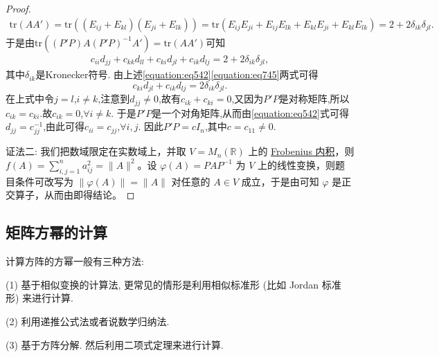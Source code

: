 \documentclass[../../main.tex]{subfiles}
\begin{document}
\begin{proof}
\begin{align*}
\mathrm{tr}\left( AA' \right) =\mathrm{tr}\left( \left( E_{ij}+E_{kl} \right) \left( E_{ji}+E_{lk} \right) \right) =\mathrm{tr}\left( E_{ij}E_{ji}+E_{ij}E_{lk}+E_{kl}E_{ji}+E_{kl}E_{lk} \right)=2 + 2\delta_{ik}\delta_{jl}.    
\end{align*}
于是由$\text{tr}((P'P)A(P'P)^{-1}A')=\text{tr}(AA')$可知
\begin{align}\label{equation:eq745}
c_{ii}d_{jj}+c_{kk}d_{ll}+c_{ki}d_{jl}+c_{ik}d_{lj}=2 + 2\delta_{ik}\delta_{jl},  
\end{align}
其中\(\delta_{ik}\)是Kronecker符号. 由上述\eqref{equation:eq542}\eqref{equation:eq745}两式可得
\[
c_{ki}d_{jl}+c_{ik}d_{lj}=2\delta_{ik}\delta_{jl}.
\]
在上式中令\(j = l\),\(i\neq k\),注意到\(d_{jj}\neq0\),故有\(c_{ik}+c_{ki}=0\),又因为\(P'P\)是对称矩阵,所以\(c_{ik}=c_{ki}\).故\(c_{ik}=0\),\(\forall i\neq k\). 于是\(P'P\)是一个对角矩阵,从而由\eqref{equation:eq542}式可得\(d_{jj}=c_{jj}^{-1}\),由此可得\(c_{ii}=c_{jj}\),\(\forall i,j\). 因此\(P'P = cI_n\),其中\(c = c_{11}\neq0\).

{\color{blue}证法二:}
我们把数域限定在实数域上，并取 \(V = M_n(\mathbb{R})\) 上的 \hyperlink{Frobenius 内积}{Frobenius 内积}，则 \(f(A)=\sum_{i,j = 1}^{n}a_{ij}^2=\|A\|^2\)。设 \(\varphi(A)=PAP^{-1}\) 为 \(V\) 上的线性变换，则题目条件可改写为 \(\|\varphi(A)\|=\|A\|\) 对任意的 \(A\in V\) 成立，于是由可知 \(\varphi\) 是正交算子，从而由即得结论。

\end{proof}


\subsection{矩阵方幂的计算}

计算方阵的方幂一般有三种方法:

(1) 基于相似变换的计算法, 更常见的情形是利用相似标准形 (比如 Jordan 标准形) 来进行计算.

(2) 利用递推公式法或者说数学归纳法.

(3) 基于方阵分解. 然后利用二项式定理来进行计算.
\end{document}

